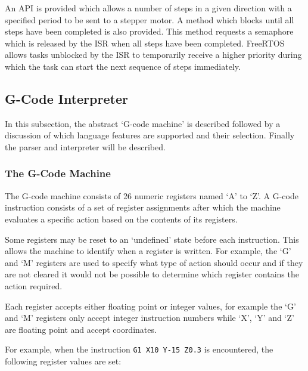				An API is provided which allows a number of steps in a given direction
				with a specified period to be sent to a stepper motor. A method which
				blocks until all steps have been completed is also provided. This method
				requests a semaphore which is released by the ISR when all steps have
				been completed. FreeRTOS allows tasks unblocked by the ISR to
				temporarily receive a higher priority during which the task can start
				the next sequence of steps immediately.
		
		\subsection{G-Code Interpreter}
			
			In this subsection, the abstract `G-code machine' is described followed by
			a discussion of which language features are supported and their selection.
			Finally the parser and interpreter will be described.
			
			\subsubsection{The G-Code Machine}
				
				\label{sec:gcodemachine}
				
				The G-code machine consists of 26 numeric registers named `A' to `Z'.
				A G-code instruction consists of a set of register assignments after
				which the machine evaluates a specific action based on the contents of
				its registers.
				
				Some registers may be reset to an `undefined' state before each
				instruction. This allows the machine to identify when a register is
				written. For example, the `G' and `M' registers are used to specify what
				type of action should occur and if they are not cleared it would not be
				possible to determine which register contains the action required.
				
				Each register accepts either floating point or integer values, for
				example the `G' and `M' registers only accept integer instruction
				numbers while `X', `Y' and `Z' are floating point and accept
				coordinates.
				
				For example, when the instruction \verb|G1 X10 Y-15 Z0.3| is
				encountered, the following register values are set:
				
				\begin{gcoderegs}
				\end{gcoderegs}
				
